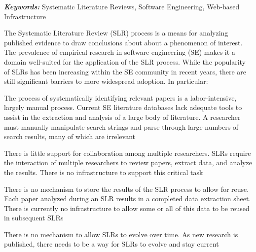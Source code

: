 
{\bfseries\sffamily\slshape Keywords:} Systematic Literature Reviews, Software Engineering, Web-based Infrastructure

The Systematic Literature Review (SLR) process is a means for analyzing published evidence to draw conclusions about about a phenomenon of interest. The prevalence of empirical research in software engineering (SE) makes it a domain well-suited for the application of the SLR process. While the popularity of SLRs has been increasing within the SE community in recent years, there are still significant barriers to more widespread adoption. In particular:
\begin{itemize*}
   \vspace*{-3pt}
	\item{The process of systematically identifying relevant papers is a labor-intensive, largely manual process. Current SE literature databases lack adequate tools to assist in the extraction and analysis of a large body of literature. A researcher must manually manipulate search strings and parse through large numbers of search results, many of which are irrelevant}
   \vspace*{6pt}
	\item{There is little support for collaboration among multiple researchers. SLRs require the interaction of multiple researchers to review papers, extract data, and analyze the results. There is no infrastructure to support this critical task}
   \vspace*{6pt}
	\item{There is no mechanism to store the results of the SLR process to allow for reuse. Each paper analyzed during an SLR results in a completed data extraction sheet. There is currently no infrastructure to allow some or all of this data to be reused in subsequent SLRs}
   \vspace*{6pt}
	\item{There is no mechanism to allow SLRs to evolve over time. As new research is published, there needs to be a way for SLRs to evolve and stay current}
   \vspace*{-3pt}
\end{itemize*}

